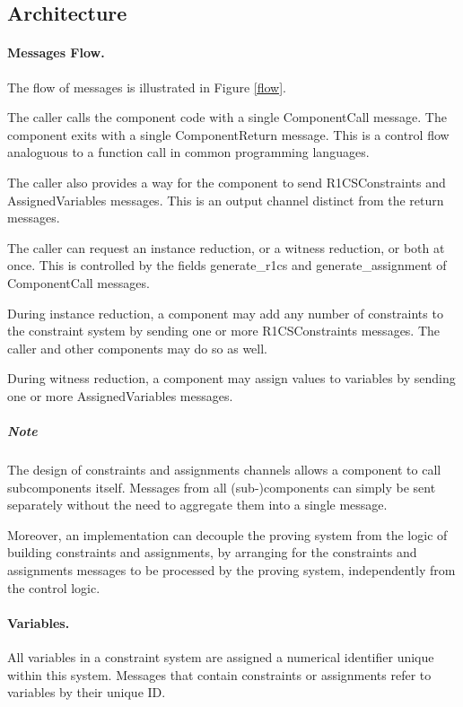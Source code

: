 \subsection{Architecture}

\paragraph{Messages Flow.}

	The flow of messages is illustrated in Figure \ref{flow}.

	The caller calls the component code with a single ComponentCall message.
	The component exits with a single ComponentReturn message.
	This is a control flow analoguous to a function call in common programming languages.

	The caller also provides a way for the component to send 
	R1CSConstraints and AssignedVariables messages.
	This is an output channel distinct from the return messages.

	The caller can request an instance reduction, or a witness reduction, or both at once.
	This is controlled by the fields generate\_r1cs and generate\_assignment of ComponentCall messages.

	During instance reduction,
	a component may add any number of constraints to the constraint system
	by sending one or more R1CSConstraints messages.
	The caller and other components may do so as well.

	During witness reduction,
	a component may assign values to variables
	by sending one or more AssignedVariables messages.

	\subparagraph{Note}
	The design of constraints and assignments channels
	allows a component to call subcomponents itself.
	Messages from all (sub-)components can simply be sent separately
	without the need to aggregate them into a single message.
	
	Moreover, an implementation can decouple the proving system
	from the logic of building constraints and assignments,
	by arranging for the constraints and assignments messages
	to be processed by the proving system, independently from the control logic.

\paragraph{Variables.}

	All variables in a constraint system are assigned a numerical identifier
	unique within this system.
	Messages that contain constraints or assignments refer to variables by their
	unique ID.

